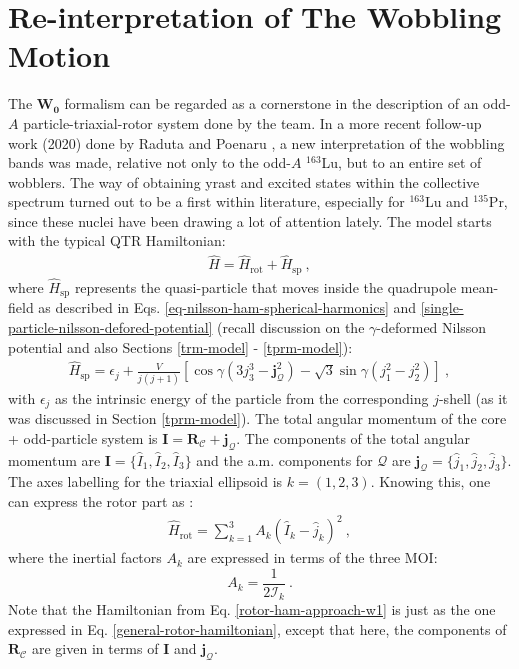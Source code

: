 \section{Re-interpretation of The Wobbling Motion}

The $\mathbf{W_0}$ formalism can be regarded as a cornerstone in the description of an odd-$A$ particle-triaxial-rotor system done by the team. In a more recent follow-up work (2020) done by Raduta and Poenaru \cite{raduta2020approach,raduta2020towards}, a new interpretation of the wobbling bands was made, relative not only to the odd-$A$ $^{163}$Lu, but to an entire set of wobblers. The way of obtaining yrast and excited states within the collective spectrum turned out to be a first within literature, especially for $^{163}$Lu and $^{135}$Pr, since these nuclei have been drawing a lot of attention lately. The model starts with the typical QTR Hamiltonian:
\begin{align}
    \hat{H}=\hat{H}_\text{rot}+\hat{H}_\text{sp}\ ,
    \label{total-ham-approach-w1}
\end{align}
where $\hat{H}_\text{sp}$ represents the quasi-particle that moves inside the quadrupole mean-field as described in Eqs. \ref{eq-nilsson-ham-spherical-harmonics} and \ref{single-particle-nilsson-defored-potential} (recall discussion on the $\gamma$-deformed Nilsson potential and also Sections \ref{trm-model} - \ref{tprm-model}):
\begin{align}
    \hat{H}_\text{sp}=\epsilon_j+\frac{V}{j(j+1)}\left[\cos\gamma\left(3j_3^3-\mathbf{j}_\mathcal{Q}^2\right)-\sqrt{3}\sin\gamma\left(j_1^2-j_2^2\right)\right]\ ,
    \label{single-particle-ham-approach-w1}
\end{align}
with $\epsilon_j$ as the intrinsic energy of the particle from the corresponding $j$-shell (as it was discussed in Section \ref{tprm-model}). The total angular momentum of the core + odd-particle system is $\mathbf{I}=\mathbf{R}_\mathscr{C}+\mathbf{j}_{\mathcal{Q}}$. The components of the total angular momentum are $\mathbf{I}=\{\hat{I}_1,\hat{I}_2,\hat{I}_3\}$ and the a.m. components for $\mathcal{Q}$ are $\mathbf{j}_{\mathcal{Q}}=\{\hat{j}_1,\hat{j}_2,\hat{j}_3\}$. The axes labelling for the triaxial ellipsoid is $k=(1,2,3)$. Knowing this, one can express the rotor part as \cite{raduta2020approach}:
\begin{align}
    \hat{H}_\text{rot}=\sum_{k=1}^3A_k(\hat{I}_k-\hat{j}_k)^2\ ,
    \label{rotor-ham-approach-w1}
\end{align}
where the inertial factors $A_k$ are expressed in terms of the three MOI:$$A_k=\frac{1}{2\mathcal{I}_k}\ .$$
Note that the Hamiltonian from Eq. \ref{rotor-ham-approach-w1} is just as the one expressed in Eq. \ref{general-rotor-hamiltonian}, except that here, the components of $\mathbf{R}_\mathscr{C}$ are given in terms of $\mathbf{I}$ and $\mathbf{j}_{\mathcal{Q}}$.

